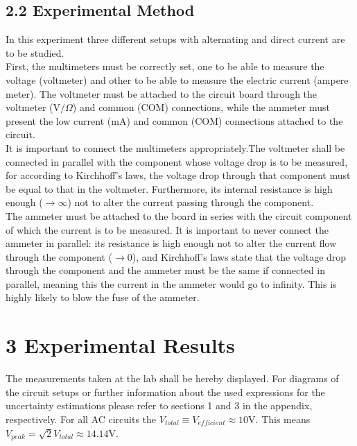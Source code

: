 \documentclass[a4paper, 12pt]{article}
\begin{document}
\subsection{2.2 Experimental Method}
In this experiment three different setups with alternating and direct current are to be studied.\\

First, the multimeters must be correctly set, one to be able to measure the voltage (voltmeter) and other to be able to measure the electric current (ampere meter). The voltmeter must be attached to the circuit board through the voltmeter (V$/\Omega$) and common (COM) connections, while the ammeter must present the low current (mA) and common (COM) connections attached to the circuit.\\

It is important to connect the multimeters appropriately.The voltmeter shall be connected in parallel with the component whose voltage drop is to be measured, for according to Kirchhoff's laws, the voltage drop through that component must be equal to that in the voltmeter. Furthermore, its internal resistance is high enough ($\longrightarrow \infty$) not to alter the current passing through the component. \\

The ammeter must be attached to the board in series with the circuit component of which the current is to be measured. It is important to never connect the ammeter in parallel: its resistance is high enough not to alter the current flow through the component ($\longrightarrow 0$), and Kirchhoff's laws state that the voltage drop through the component and the ammeter must be the same if connected in parallel, meaning this the current in the ammeter would go to infinity. This is highly likely to blow the fuse of the ammeter.

\section{3 Experimental Results}
The measurements taken at the lab shall be hereby displayed. For diagrams of the circuit setups or further information about the used expressions for the uncertainty estimations please refer to sections 1 and 3 in the appendix, respectively. For all AC circuits the $V_{total} \equiv V_{efficient} \approx 10$V. This means $V_{peak} = \sqrt 2 V_{total} \approx 14.14$V.
\end{document}

